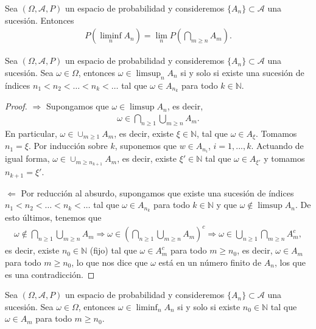\begin{teo}
    Sea $(\Omega,\mathcal{A},P)$ un espacio de probabilidad y consideremos $\{A_n\} \subset \mathcal{A}$ una sucesión. Entonces
    \begin{align*}
        P\left( \liminf_n A_n \right) = \lim_n P\left( \bigcap_{m \ge n} A_m \right).
    \end{align*}
\end{teo}

\begin{teo}
    Sea $(\Omega,\mathcal{A},P)$ un espacio de probabilidad y consideremos $\{A_n\} \subset \mathcal{A}$ una sucesión. Sea $\omega \in \Omega$, entonces $\omega \in \limsup_n A_n$ si y solo si existe una sucesión de índices $n_1 < n_2 < \ldots < n_k < \ldots $ tal que $\omega \in A_{n_k}$ para todo $k \in \mathbb{N}$.
\end{teo}

\begin{proof}
    $\boxed{\Longrightarrow}$ Supongamos que $\omega \in \limsup A_n$, es decir,
    \begin{align*}
        \omega \in \bigcap_{n \ge 1} \bigcup_{m \ge n} A_m.
    \end{align*}
    En particular, $\omega \in \cup_{m \ge 1} A_m$, es decir, existe $\xi \in \mathbb{N}$, tal que $\omega \in A_{\xi}$. Tomamos $n_1 = \xi$. Por inducción sobre $k$, suponemos que $w \in A_{n_i}$, $i=1,...,k$. Actuando de igual forma, $\omega \in \cup_{m \ge n_{k+1}} A_m$, es decir, existe $\xi' \in \mathbb{N}$ tal que $\omega \in A_{\xi'}$ y tomamos $n_{k+1} = \xi'$.

    $\boxed{\Longleftarrow}$ Por reducción al absurdo, supongamos que existe una sucesión de índices $n_1 < n_2 < \ldots < n_k < \ldots $ tal que $\omega \in A_{n_k}$ para todo $k \in \mathbb{N}$ y que $\omega \not \in \limsup A_n$. De esto últimos, tenemos que
    \begin{align*}
        \omega \not \in \bigcap_{n \ge 1} \bigcup_{m \ge n} A_m \Longrightarrow \omega \in \left( \bigcap_{n \ge 1} \bigcup_{m \ge n} A_m \right)^c \Longrightarrow \omega \in \bigcup_{n \ge 1} \bigcap_{m \ge n} A_m^c,
    \end{align*}
    es decir, existe $n_0 \in \mathbb{N}$ (fijo) tal que $\omega \in A_m^c$ para todo $m \ge n_0$, es decir, $\omega \in A_m$ para todo $m \ge n_0$, lo que nos dice que $\omega$ está en un número finito de $A_n$, los que es una contradicción.
\end{proof}

\begin{teo}
    Sea $(\Omega,\mathcal{A},P)$ un espacio de probabilidad y consideremos $\{A_n\} \subset \mathcal{A}$ una sucesión. Sea $\omega \in \Omega$, entonces $\omega \in \liminf_n A_n$ si y solo si existe $n_0 \in \mathbb{N}$ tal que $\omega \in A_m$ para todo $m \ge n_0$.
\end{teo}

